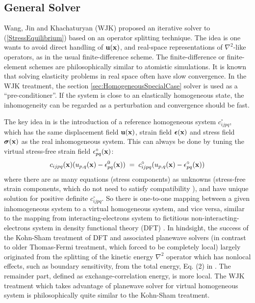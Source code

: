 \documentclass[12pt]{article}
\def\bmath#1{\mbox{\boldmath$#1$}}
\begin{document}
\subsection{General Solver}

Wang, Jin and Khachaturyan (WJK) proposed an iterative solver to
(\ref{StressEquilibrium}) based on an operator splitting technique.
The idea is one wants to avoid direct handling of ${\bf u}({\bf x})$,
and real-space representations of $\nabla^2$-like operators, as in the
usual finite-difference scheme. The finite-difference or
finite-element schemes are philosophically similar to atomistic
simulations.  It is known that solving elasticity problems in real
space often have slow convergence. In the WJK treatment, the section
\ref{sec:HomogeneousSpecialCase} solver is used as a
``pre-conditioner''.  If the system is close to an elastically
homogeneous state, the inhomogeneity can be regarded as a perturbation
and convergence should be fast.

The key idea in \cite{WangJK02} is the introduction of a reference
homogeneous system $c^\circ_{ijpq}$, which has the same displacement
field ${\bf u}({\bf x})$, strain field $\bmath{\epsilon}({\bf x})$ and
stress field $\bmath{\sigma}({\bf x})$ as the real inhomogeneous
system.  This can always be done by tuning the virtual stress-free
strain field $\epsilon^\circ_{pq}({\bf x})$:
\begin{equation}
 c_{ijpq}({\bf x}) ( u_{p,q}({\bf x}) - \epsilon^0_{pq}({\bf x})) \;=\; 
 c^\circ_{ijpq} (u_{p,q}({\bf x}) - \epsilon^\circ_{pq}({\bf x}))
 \label{StressMapping}
\end{equation}
where there are as many equations (stress components) as unknowns
(stress-free strain components, which do not need to satisfy
compatibility \cite{Jagla07}), and have unique solution for positive
definite $c^\circ_{ijpq}$.  So there is one-to-one mapping between a
given inhomogeneous system to a virtual homogeneous system, and vice
versa, similar to the mapping from interacting-electrons system to
fictitious non-interacting-electrons system in density functional
theory (DFT) \cite{KohnS65}.  In hindsight, the success of the
Kohn-Sham treatment of DFT and associated planewave solvers (in
contrast to older Thomas-Fermi treatment, which forced to be
completely local) largely originated from the splitting of the kinetic
energy $\nabla^2$ operator which has nonlocal effects, such as
boundary sensitivity, from the total energy, Eq. (2) in
\cite{KohnS65}.  The remainder part, defined as exchange-correlation
energy, is more local.  The WJK treatment which takes advantage of
planewave solver for virtual homogeneous system is philosophically
quite similar to the Kohn-Sham treatment.
\end{document}

